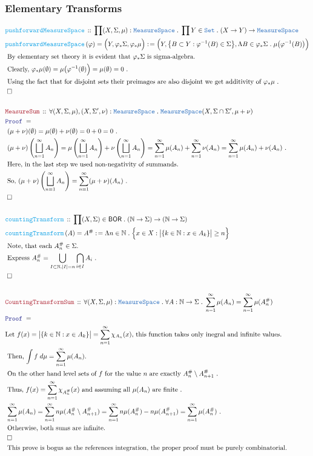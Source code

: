 \documentclass[12pt]{scrartcl}
\newcommand{\TYPE}[1]{\textcolor{NavyBlue}{\mathtt{#1}}}
\newcommand{\FUNC}[1]{\textcolor{Cerulean}{\mathtt{#1}}}
\newcommand{\LOGIC}[1]{\textcolor{Blue}{\mathtt{#1}}}
\newcommand{\THM}[1]{\textcolor{Maroon}{\mathtt{#1}}}
\renewcommand{\.}{\; . \;}
\newcommand{\de}{: \kern 0.1pc =}
\newcommand{\Act}[1]{\left( #1 \right)}
\newcommand{\Theorem}[2]{& \THM{#1} \, :: \, #2 \\ & \Proof = \\ }
\newcommand{\DeclareFunc}[2]{& \FUNC{#1} \, :: \, #2 \\}
\newcommand{\DefineNamedFunc}[4]{&  \FUNC{#1}\Act{#2} = #3 \de #4 \\}
\newcommand{\Page}[1]{ \begin{align*} #1 \end{align*}   }
\newcommand{\Nat}{\mathbb{N} }
\newcommand{\Set}{\TYPE{Set}}
\newcommand{\QED}{\; \square}
\newcommand{\EndProof}{& \QED \\}
\newcommand{\Proof}{\LOGIC{Proof} \; }
\newcommand{\Explain}[1]{& \text{#1.} \\}
\newcommand{\BOR}{\mathsf{BOR}}
\newcommand{\MS}{\TYPE{MeasureSpace}}
\begin{document}
\subsubsection{Elementary Transforms}
\Page{
	\DeclareFunc{pushforwardMeasureSpace}
	{
		\prod (X,\Sigma,\mu) : \MS \.
		\prod Y \in \Set \. 
		(X \to Y) \to \MS
	}
	\DefineNamedFunc{pushforwardMeasureSpace}
	{\varphi}{\Big(Y,\varphi_*\Sigma,\varphi_*\mu\Big)}
	{
		\Big( Y, \big\{ B \subset Y : \varphi^{-1}(B) \in \Sigma  \big\},
		\Lambda B \in  \varphi_*\Sigma \. \mu\big( \varphi^{-1}(B) \big)\Big)
	}
	\Explain{ By elementary set theory it is evident that $\varphi_*\Sigma$ is sigma-algebra}
	\Explain{ Clearly, 
		$\varphi_*\mu(\emptyset) = 
		\mu\big( \varphi^{-1}(\emptyset)\Big) = 
		\mu(\emptyset) = 0
		$ }
	\Explain{ Using the fact that for disjoint sets their preimages are also disjoint we get additivity of 
		$\varphi_*\mu$ }
	\EndProof
	\\
	\Theorem{MeasureSum}
	{
		\forall (X,\Sigma,\mu),(X,\Sigma',\nu) : \MS \.
		\MS(X,\Sigma \cap \Sigma',\mu + \nu)
	}
	\Explain{ $ (\mu + \nu)(\emptyset) = \mu(\emptyset) + \nu(\emptyset)  = 0 + 0 = 0$ }
	\Explain{
		$
			(\mu + \nu)\left( \bigsqcup^\infty_{n=1} A_n  \right) = 
			\mu\left( \bigsqcup^\infty_{n=1} A_n  \right)
			+
			\nu\left( \bigsqcup^\infty_{n=1} A_n  \right) =
			\sum^\infty_{n=1} \mu(A_n)
			+
			\sum^\infty_{n=1} \nu(A_n) =
			\sum^\infty_{n=1} \mu(A_n) + \nu(A_n) 
		$
	}
	\Explain{ Here, in the last step we used non-negativity of summands}
	\Explain{ So, 
		$  (\mu + \nu)\left( \bigsqcup^\infty_{n=1} A_n  \right)  =
		 \sum^\infty_{n=1} (\mu + \nu)(A_n)$
	}
	\EndProof
	\\
	\DeclareFunc{countingTransform}
	{
		\prod (X,\Sigma) \in \BOR \.
		(\Nat \to \Sigma) \to (\Nat \to \Sigma)
	}
	\DefineNamedFunc{countingTransform}{A}{A^\#}
	{
		\Lambda n \in \Nat \.
		\Big\{
			x \in X : \big| \{ k \in \Nat : x \in A_k  \} \big| \ge n 	
		\Big\}
	}
	\Explain{ Note, that each $A^\#_n \in \Sigma$}
	\Explain{ Express $A^\#_n = \bigcup_{I \subset \Nat,|I|=n} \bigcap_{i \in I} A_i  $  } 
	\EndProof
	\\
	\Theorem{CountingTransformSum}
	{
		\forall (X,\Sigma,\mu) : \MS \.
		\forall A : \Nat \to \Sigma \.
		\sum^\infty_{n=1} \mu(A_n) = \sum^\infty_{n=1} \mu(A^\#_{n})
	}
	\Explain{Let $f(x) = \big| \{ k \in \Nat : x \in A_k  \} \big| = \sum^\infty_{n=1} \chi_{A_n}(x)$,
		this function takes only inegral and infinite values}
	\Explain{
	Then, $\int f  \; d\mu = \sum^\infty_{n=1} \mu(A_n)$}
	\Explain{ 
		On the other hand level sets of $f$ 
		for the value $n$ are exactly $A^\#_n \setminus A^\#_{n+1}$ }
	\Explain{
		Thus, $f(x) = \sum^\infty_{n=1} \chi_{A^\#_{n}}(x)$
		and assuming all $\mu(A_n)$ are finite
		}
	\Explain{
		$
			\sum^\infty_{n=1} \mu(A_n) = 
			\sum^\infty_{n=1} n\mu(A^\#_{n} \setminus A^\#_{n+1}) =
			\sum^\infty_{n=1} n\mu(A^\#_{n}) - n\mu(A^\#_{n+1}) =
			\sum^\infty_{n=1} \mu(A^\#_{n})
		$
	}
	\Explain{
		Otherwise, both sums are infinite}
	\EndProof
	\Explain{
		This prove is bogus as the references integration, 
		the proper proof must be purely combinatorial}
}
\end{document}
